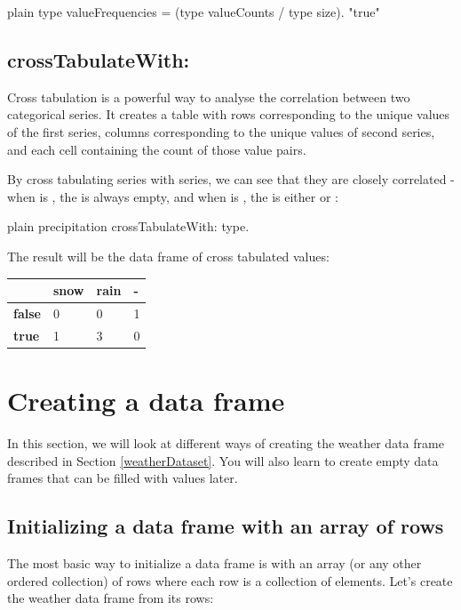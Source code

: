 \documentclass[10pt,twoside,english]{_support/latex/sbabook/sbabook}
\begin{document}
\begin{displaycode}{plain}
type valueFrequencies = (type valueCounts / type size). "true"
\end{displaycode}
\subsection{crossTabulateWith:}
Cross tabulation is a powerful way to analyse the correlation between two categorical series. It creates a table with rows corresponding to the unique values of the first series, columns corresponding to the unique values of second series, and each cell containing the count of those value pairs.

By cross tabulating  series with  series, we can see that they are closely correlated - when  is , the  is always empty, and when  is , the  is either  or :

\begin{displaycode}{plain}
precipitation crossTabulateWith: type.
\end{displaycode}

The result will be the data frame of cross tabulated values:

\begin{tabular}{llll}
\toprule
 & \textbf{snow} & \textbf{rain} & \textbf{-} \\
\midrule
\textbf{false} & 0 & 0 & 1 \\
\textbf{true} & 1 & 3 & 0 \\
\bottomrule
\end{tabular}
\section{Creating a data frame}
In this section, we will look at different ways of creating the weather data frame described in Section \ref{weatherDataset}.
You will also learn to create empty data frames that can be filled with values later.
\subsection{Initializing a data frame with an array of rows}
The most basic way to initialize a data frame is with an array (or any other ordered collection) of rows where each row is a collection of elements. Let's create the weather data frame from its rows:
\end{document}
